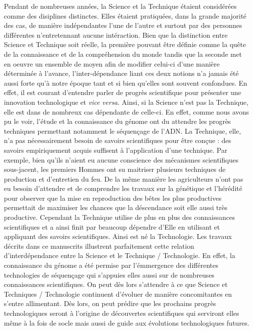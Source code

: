 \documentclass[12pt,twoside]{reedthesis}
\begin{document}
  Pendant de nombreuses années, la Science et la Technique étaient
  considérées comme des disiplines distinctes. Elles étaient pratiquées,
  dans la grande majorité des cas, de manière indépendantes l'une de
  l'autre et surtout par des personnes différentes n'entretennant aucune
  intéraction. Bien que la distinction entre Science et Technique soit
  réelle, la première pouvant être définie comme la quête de la
  connaissance et de la compréhension du monde tandis que la seconde met
  en oeuvre un ensemble de moyen afin de modifier celui-ci d'une manière
  déterminée à l'avance, l'inter-dépendance liant ces deux notions n'a
  jamais été aussi forte qu'à notre époque tant et si bien qu'elles sont
  souvent confondues. En effet, il est courant d'entendre parler de
  progrès scientifique pour présenter une innovation technologique et
  \emph{vice versa}. Ainsi, si la Science n'est pas la Technique, elle est
  dans de nombreux cas dépendante de celle-ci. En effet, comme nous avons
  pu le voir, l'étude et la connaissance du génome ont du attendre les
  progrès techniques permettant notamment le séquençage de l'ADN. La
  Technique, elle, n'a pas nécessairement besoin de savoirs scientifiques
  pour être conçue : des savoirs empiriquement acquis suffisent à
  l'application d'une technique. Par exemple, bien qu'ils n'aient eu
  aucune conscience des mécanismes scientifiques sous-jacent, les premiers
  Hommes ont su maitriser plusieurs techniques de production et
  d'entretien du feu. De la même manière les agriculteurs n'ont pas eu
  besoin d'attendre et de comprendre les travaux sur la génétique et
  l'hérédité pour observer que la mise en reproduction des bêtes les plus
  productives permettait de maximiser les chances que la déscendance soit
  elle aussi très productive. Cependant la Technique utilise de plus en
  plus des connaissances scientifiques et a ainsi finit par beaucoup
  dépendre d'Elle en utilisant et appliquant des savoirs scientifiques.
  Ainsi est né la Technologie. Les travaux décrits dans ce manuscrits
  illustrent parfaitement cette relation d'interdépendance entre la
  Science et le Technique / Technologie. En effet, la connaissance du
  génome a été permise par l'émmergence des différentes technologies de
  séquençage qui s'appuies elles aussi sur de nombreuses connaissances
  scientifiques. On peut dès lors s'attendre à ce que Science et
  Techniques / Technologie continuent d'évoluer de manière concomitantes
  en s'entre allimentant. Dès lors, on peut prédire que les prochains
  progrès technologiques seront à l'origine de découvertes scientifiques
  qui serviront elles même à la fois de socle mais aussi de guide aux
  évolutions technologiques futures.
  
\end{document}
